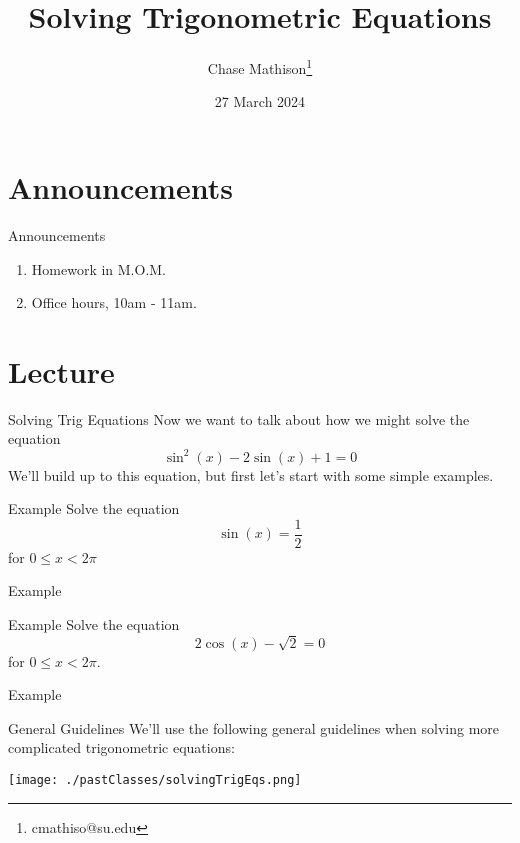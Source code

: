 \documentclass[presentation]{beamer}
\institute[SU]{Shenandoah University}
\author{Chase Mathison\thanks{cmathiso@su.edu}}
\date{27 March 2024}
\title{Solving Trigonometric Equations}
\begin{document}
\maketitle

\section{Announcements}
\label{sec:org28a8310}
\begin{frame}[label={sec:org5cb3918}]{Announcements}
\begin{enumerate}
\item Homework in M.O.M.
\item Office hours, 10am - 11am.
\end{enumerate}
\end{frame}

\section{Lecture}
\label{sec:org3d9b4d2}
\begin{frame}[label={sec:org93ee308}]{Solving Trig Equations}
Now we want to talk about how we might solve the equation
\[
\sin^2 (x) - 2\sin(x) + 1 = 0\]
We'll build up to this equation, but first let's start with some simple examples.
\vspace{10in}
\end{frame}

\begin{frame}[label={sec:org71ad25d}]{Example}
Solve the equation
\[
\sin(x) = \frac{1}{2}\]
for \(0 \le x < 2\pi\)

\vspace{10in}
\end{frame}

\begin{frame}[label={sec:org5dbb93b}]{Example}
\end{frame}

\begin{frame}[label={sec:org27aaf86}]{Example}
Solve the equation
\[
2\cos(x) - \sqrt{2} = 0 \]
for \(0 \le x < 2\pi\).
\vspace{10in}
\end{frame}

\begin{frame}[label={sec:orga8b973b}]{Example}
\end{frame}

\begin{frame}[label={sec:org592fb53}]{General Guidelines}
We'll use the following general guidelines when solving more complicated trigonometric
equations:

\begin{center}
\texttt{[image: ./pastClasses/solvingTrigEqs.png]}
\end{center}
\end{frame}
\end{document}
